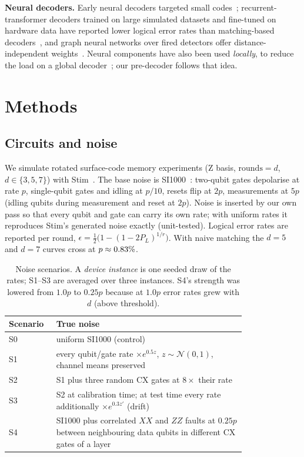 \documentclass[11pt]{article}
\begin{document}
\textbf{Neural decoders.} Early neural decoders targeted small codes~\cite{torlai2017}; recurrent-transformer decoders trained on large simulated datasets and fine-tuned on hardware data have reported lower logical error rates than matching-based decoders~\cite{bausch2024}, and graph neural networks over fired detectors offer distance-independent weights~\cite{lange2025}. Neural components have also been used \emph{locally}, to reduce the load on a global decoder~\cite{delfosse2020,chamberland2023}; our pre-decoder follows that idea.

\section{Methods}
\subsection{Circuits and noise}
We simulate rotated surface-code memory experiments (Z basis, $\text{rounds}=d$, $d\in\{3,5,7\}$) with Stim~\cite{gidney2021stim}. The base noise is SI1000~\cite{gidney2021honeycomb}: two-qubit gates depolarise at rate $p$, single-qubit gates and idling at $p/10$, resets flip at $2p$, measurements at $5p$ (idling qubits during measurement and reset at $2p$). Noise is inserted by our own pass so that every qubit and gate can carry its own rate; with uniform rates it reproduces Stim's generated noise exactly (unit-tested). Logical error rates are reported per round, $\epsilon=\tfrac12\bigl(1-(1-2P_L)^{1/r}\bigr)$. With naive matching the $d=5$ and $d=7$ curves cross at $p\approx0.83\%$.

\begin{table}[t]
\centering\small
\begin{tabular}{@{}lp{0.8\linewidth}@{}}
\toprule
Scenario & True noise \\
\midrule
S0 & uniform SI1000 (control) \\
S1 & every qubit/gate rate $\times e^{0.5z}$, $z\sim\mathcal N(0,1)$, channel means preserved \\
S2 & S1 plus three random CX gates at $8\times$ their rate \\
S3 & S2 at calibration time; at test time every rate additionally $\times e^{0.3z'}$ (drift) \\
S4 & SI1000 plus correlated $XX$ and $ZZ$ faults at $0.25p$ between neighbouring data qubits in different CX gates of a layer \\
\bottomrule
\end{tabular}
\caption{Noise scenarios. A \emph{device instance} is one seeded draw of the rates; S1--S3 are averaged over three instances. S4's strength was lowered from $1.0p$ to $0.25p$ because at $1.0p$ error rates grew with $d$ (above threshold).}
\label{tab:scenarios}
\end{table}
\end{document}
